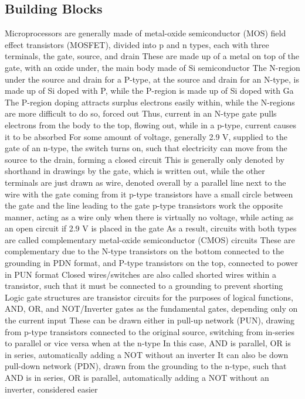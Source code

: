 \documentclass[11 pt, twoside]{article}
\newenvironment{outline*}
{
	\begin{outline}[enumerate]
	}
	{\end{outline}
}
\begin{document}
\subsection{Building Blocks}
\begin{outline*}
\1 Microprocessors are generally made of metal-oxide semiconductor (MOS) field effect transistors (MOSFET), divided into p and n types, each with three terminals, the gate, source, and drain
\2 These are made up of a metal on top of the gate, with an oxide under, the main body made of Si semiconductor
\3 The N-region under the source and drain for a P-type, at the source and drain for an N-type, is made up of Si doped with P, while the P-region is made up of Si doped with Ga
\3 The P-region doping attracts surplus electrons easily within, while the N-regions are more difficult to do so, forced out
\3 Thus, current in an N-type gate pulls electrons from the body to the top, flowing out, while in a p-type, current causes it to be absorbed
\2 For some amount of voltage, generally 2.9 V, supplied to the gate of an n-type, the switch turns on, such that electricity can move from the source to the drain, forming a closed circuit
\3 This is generally only denoted by shorthand in drawings by the gate, which is written out, while the other terminals are just drawn as wire, denoted overall by a parallel line next to the wire with the gate coming from it
\3 p-type transistors have a small circle between the gate and the line leading to the gate
\2 p-type transistors work the opposite manner, acting as a wire only when there is virtually no voltage, while acting as an open circuit if 2.9 V is placed in the gate
\2 As a result, circuits with both types are called complementary metal-oxide semiconductor (CMOS) circuits
\3 These are complementary due to the N-type transistors on the bottom connected to the grounding in PDN format, and P-type transistors on the top, connected to power in PUN format
\2 Closed wires/switches are also called shorted wires within a transistor, such that it must be connected to a grounding to prevent shorting
\1 Logic gate structures are transistor circuits for the purposes of logical functions, AND, OR, and NOT/Inverter gates as the fundamental gates, depending only on the current input
\2 These can be drawn either in pull-up network (PUN), drawing from p-type transistors connected to the original source, switching from in-series to parallel or vice versa when at the n-type
\3 In this case, AND is parallel, OR is in series, automatically adding a NOT without an inverter
\3 It can also be down pull-down network (PDN), drawn from the grounding to the n-type, such that AND is in series, OR is parallel, automatically adding a NOT without an inverter, considered easier

\end{outline*}
\end{document}
